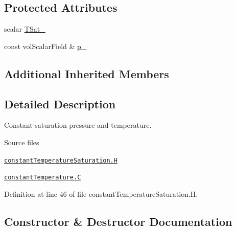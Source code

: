 \subsection*{Protected Attributes}
\begin{DoxyCompactItemize}
\item 
scalar \hyperlink{classFoam_1_1saturationModels_1_1constantTemperature_a80b4b3ccd6d90834eef458f1b5c95370}{T\+Sat\+\_\+}
\item 
const vol\+Scalar\+Field \& \hyperlink{classFoam_1_1saturationModels_1_1constantTemperature_a4c9ce31e482786bbeeed352570fd8d09}{p\+\_\+}
\end{DoxyCompactItemize}
\subsection*{Additional Inherited Members}


\subsection{Detailed Description}
Constant saturation pressure and temperature. 

\label{_Description}%
 \begin{DoxyParagraph}{Source files}

\begin{DoxyItemize}
\item \href{../../../home/carlo/data/GeN-Foam/GeN-Foam_ffn/GeN-Foam/GeN-Foam/classes/thermalHydraulics/src/physicsModels/phaseChangeModels/saturationModels/constantTemperature/constantTemperatureSaturation.H}{\tt constant\+Temperature\+Saturation.\+H} 
\item \href{../../../home/carlo/data/GeN-Foam/GeN-Foam_ffn/GeN-Foam/GeN-Foam/classes/thermalHydraulics/src/physicsModels/phaseChangeModels/saturationModels/constantTemperature/constantTemperature.C}{\tt constant\+Temperature.\+C} 
\end{DoxyItemize}
\end{DoxyParagraph}


Definition at line 46 of file constant\+Temperature\+Saturation.\+H.



\subsection{Constructor \& Destructor Documentation}
\mbox{\label{classFoam_1_1saturationModels_1_1constantTemperature_ab458e7c9e229214c825d2fee85bbd9ee}} 
